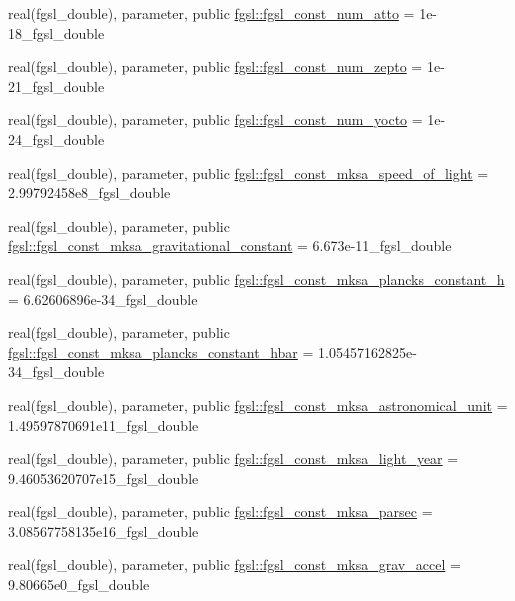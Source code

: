 \begin{DoxyCompactItemize}
\item 
real(fgsl\+\_\+double), parameter, public \hyperlink{namespacefgsl_aca23ff810481681a4329c406eb3c4bbc}{fgsl\+::fgsl\+\_\+const\+\_\+num\+\_\+atto} = 1e-\/18\+\_\+fgsl\+\_\+double
\item 
real(fgsl\+\_\+double), parameter, public \hyperlink{namespacefgsl_ac924f9358aa8ca1b7a72025328901e8e}{fgsl\+::fgsl\+\_\+const\+\_\+num\+\_\+zepto} = 1e-\/21\+\_\+fgsl\+\_\+double
\item 
real(fgsl\+\_\+double), parameter, public \hyperlink{namespacefgsl_a97bcc951d0797621c0a06cb1d63cad49}{fgsl\+::fgsl\+\_\+const\+\_\+num\+\_\+yocto} = 1e-\/24\+\_\+fgsl\+\_\+double
\item 
real(fgsl\+\_\+double), parameter, public \hyperlink{namespacefgsl_a3d8ceae8504f8bd508cbd8865e1ba1b8}{fgsl\+::fgsl\+\_\+const\+\_\+mksa\+\_\+speed\+\_\+of\+\_\+light} = 2.\+99792458e8\+\_\+fgsl\+\_\+double
\item 
real(fgsl\+\_\+double), parameter, public \hyperlink{namespacefgsl_a74c4f68c51be744dc16f9de6679690a1}{fgsl\+::fgsl\+\_\+const\+\_\+mksa\+\_\+gravitational\+\_\+constant} = 6.\+673e-\/11\+\_\+fgsl\+\_\+double
\item 
real(fgsl\+\_\+double), parameter, public \hyperlink{namespacefgsl_a1f1f5a27cac13f7f29c34ccb809e2eae}{fgsl\+::fgsl\+\_\+const\+\_\+mksa\+\_\+plancks\+\_\+constant\+\_\+h} = 6.\+62606896e-\/34\+\_\+fgsl\+\_\+double
\item 
real(fgsl\+\_\+double), parameter, public \hyperlink{namespacefgsl_a505da32ff79a7c317534298642a2ac3c}{fgsl\+::fgsl\+\_\+const\+\_\+mksa\+\_\+plancks\+\_\+constant\+\_\+hbar} = 1.\+05457162825e-\/34\+\_\+fgsl\+\_\+double
\item 
real(fgsl\+\_\+double), parameter, public \hyperlink{namespacefgsl_aa2d41436d179db0d4d442c5207737611}{fgsl\+::fgsl\+\_\+const\+\_\+mksa\+\_\+astronomical\+\_\+unit} = 1.\+49597870691e11\+\_\+fgsl\+\_\+double
\item 
real(fgsl\+\_\+double), parameter, public \hyperlink{namespacefgsl_ac9efe31fa2e902dc8cced7ce8b82c610}{fgsl\+::fgsl\+\_\+const\+\_\+mksa\+\_\+light\+\_\+year} = 9.\+46053620707e15\+\_\+fgsl\+\_\+double
\item 
real(fgsl\+\_\+double), parameter, public \hyperlink{namespacefgsl_ab701318a50ffa3b0b31f26f7882a2b16}{fgsl\+::fgsl\+\_\+const\+\_\+mksa\+\_\+parsec} = 3.\+08567758135e16\+\_\+fgsl\+\_\+double
\item 
real(fgsl\+\_\+double), parameter, public \hyperlink{namespacefgsl_a7c644841a5ff5cd815dca7cfc3383642}{fgsl\+::fgsl\+\_\+const\+\_\+mksa\+\_\+grav\+\_\+accel} = 9.\+80665e0\+\_\+fgsl\+\_\+double

\end{DoxyCompactItemize}
